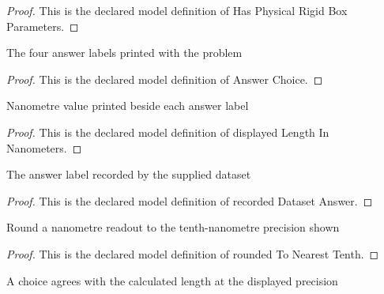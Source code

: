 \begin{proof}
  This is the declared model definition of Has Physical Rigid Box Parameters.
\end{proof}
\begin{definition}
  \label{def:physics:phyx-mini-0508:phyxminiproblems-problemphyxmini0508-answerchoice}
  The four answer labels printed with the problem
\end{definition}
\begin{proof}
  This is the declared model definition of Answer Choice.
\end{proof}
\begin{definition}
  \label{def:physics:phyx-mini-0508:phyxminiproblems-problemphyxmini0508-displayedlengthinnanometers}
  Nanometre value printed beside each answer label
\end{definition}
\begin{proof}
  This is the declared model definition of displayed Length In Nanometers.
\end{proof}
\begin{definition}
  \label{def:physics:phyx-mini-0508:phyxminiproblems-problemphyxmini0508-recordeddatasetanswer}
  The answer label recorded by the supplied dataset
\end{definition}
\begin{proof}
  This is the declared model definition of recorded Dataset Answer.
\end{proof}
\begin{definition}
  \label{def:physics:phyx-mini-0508:phyxminiproblems-problemphyxmini0508-roundedtonearesttenth}
  Round a nanometre readout to the tenth-nanometre precision shown
\end{definition}
\begin{proof}
  This is the declared model definition of rounded To Nearest Tenth.
\end{proof}
\begin{definition}
  \label{def:physics:phyx-mini-0508:phyxminiproblems-problemphyxmini0508-matchesdisplayedlength}
  A choice agrees with the calculated length at the displayed precision
\end{definition}
